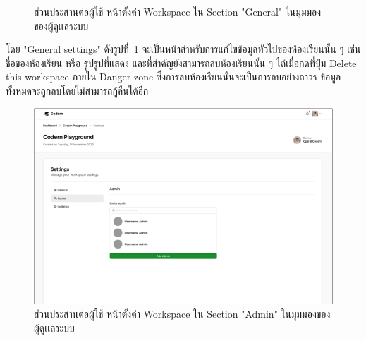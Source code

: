 \documentclass[12pt,one side,openright,a4paper]{cpe-thesis-th}
\newcommand{\thaijustify}[1]{%
  \par\hspace{30pt}\justifying
  #1
}
\begin{document}
\begin{figure}[H]
  \centering
  \caption[ส่วนประสานต่อผู้ใช้ หน้าตั้งค่า Workspace ของผู้ดูเเลระบบ (ใน "General")]{ส่วนประสานต่อผู้ใช้ หน้าตั้งค่า Workspace ใน Section "General" ในมุมมองของผู้ดูเเลระบบ}
  \label{fig:new-ui-setting-general}
\end{figure}
\thaijustify{
  โดย "General settings" ดังรูปที่~\ref{fig:new-ui-setting-general} จะเป็นหน้าสำหรับการแก้ไขข้อมูลทั่วไปของห้องเรียนนั้น ๆ เช่น ชื่อของห้องเรียน หรือ รูปรูปที่แสดง และที่สำคัญยังสามารถลบห้องเรียนนั้น ๆ ได้เมื่อกดที่ปุ่ม Delete this workspace ภายใน Danger zone ซึ่งการลบห้องเรียนนั้นจะเป็นการลบอย่างถาวร ข้อมูลทั้งหมดจะถูกลบโดยไม่สามารถกู้คืนได้อีก
}

\hypertarget{new-ui-setting-admin}{
  \begin{figure}[H]
    \centering
    \includegraphics[width=15cm]{figure/new-ui/ui-setting-admin.png}
    \caption[ส่วนประสานต่อผู้ใช้ หน้าตั้งค่า Workspace ของผู้ดูเเลระบบ (ใน "Admin")]{ส่วนประสานต่อผู้ใช้ หน้าตั้งค่า Workspace ใน Section "Admin" ในมุมมองของผู้ดูเเลระบบ}
    \label{fig:new-ui-setting-admin}
  \end{figure}
}
\end{document}
